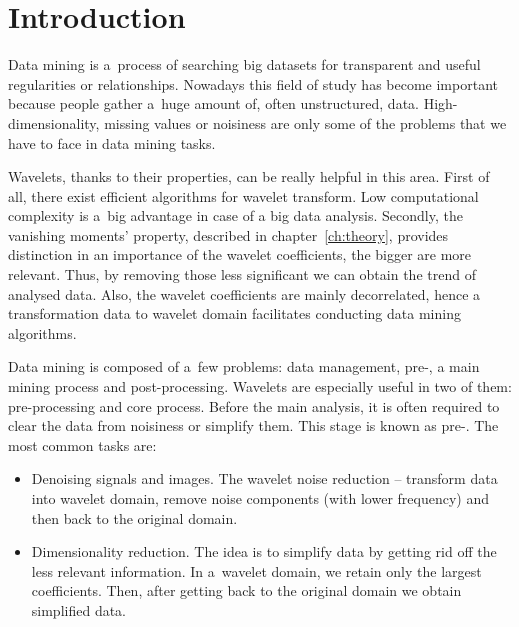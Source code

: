 \chapter*{Introduction}

Data mining is a~process of searching big datasets for transparent and useful regularities or relationships. 
Nowadays this field of study has become important because people gather a~huge amount of, often unstructured, data. High-\allowbreak dimensionality, missing values or noisiness are only some of the problems that we have to face in data mining tasks. 

Wavelets, thanks to their properties, can be really helpful in this area. First of all, there exist efficient algorithms for wavelet transform. Low computational complexity is a~big advantage in case of a big data analysis. Secondly, the vanishing moments' property, described in chapter~\ref{ch:theory}, provides distinction in an importance of the wavelet coefficients, the bigger are more relevant. Thus, by removing those less significant we can obtain the trend of analysed data. Also, the wavelet coefficients are mainly decorrelated, hence a transformation data to wavelet domain facilitates conducting data mining algorithms.
 

Data mining is composed of a~few problems: data management, pre-, a main mining process and post-processing. Wavelets are especially useful in two of them: pre-processing and core process. Before the main analysis, it is often required to clear the data from noisiness or simplify them. This stage is known as pre-. The most common tasks are:
\begin{itemize}
\item Denoising signals and images. The wavelet noise reduction -- transform data into wavelet domain, remove noise components (with lower frequency) and then back to the original domain.

\item Dimensionality reduction. The idea is to simplify data by getting rid off the less relevant information. In a~wavelet domain, we retain only the largest coefficients. Then, after getting back to the original domain we obtain simplified data.
\end{itemize}

